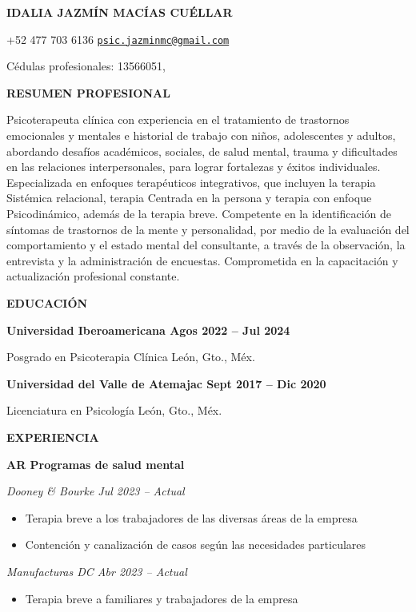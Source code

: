 \textbf{IDALIA JAZMÍN MACÍAS CUÉLLAR}

+52 477 703 6136 \textbar{}
\href{mailto:psic.jazminmc@gmail.com}{\nolinkurl{psic.jazminmc@gmail.com}}

Cédulas profesionales: 13566051,

\textbf{RESUMEN PROFESIONAL}

Psicoterapeuta clínica con experiencia en el tratamiento de trastornos
emocionales y mentales e historial de trabajo con niños, adolescentes y
adultos, abordando desafíos académicos, sociales, de salud mental,
trauma y dificultades en las relaciones interpersonales, para lograr
fortalezas y éxitos individuales. Especializada en enfoques terapéuticos
integrativos, que incluyen la terapia Sistémica relacional, terapia
Centrada en la persona y terapia con enfoque Psicodinámico, además de la
terapia breve. Competente en la identificación de síntomas de trastornos
de la mente y personalidad, por medio de la evaluación del
comportamiento y el estado mental del consultante, a través de la
observación, la entrevista y la administración de encuestas.
Comprometida en la capacitación y actualización profesional constante.

\textbf{EDUCACIÓN}

\textbf{Universidad Iberoamericana Agos 2022 -- Jul 2024}

Posgrado en Psicoterapia Clínica León, Gto., Méx.

\textbf{Universidad del Valle de Atemajac Sept 2017 -- Dic 2020}

Licenciatura en Psicología León, Gto., Méx.

\textbf{EXPERIENCIA}

\textbf{AR Programas de salud mental}

\emph{Dooney \& Bourke \textbar{} Jul 2023 -- Actual}

\begin{itemize}
\item
  Terapia breve a los trabajadores de las diversas áreas de la empresa
\item
  Contención y canalización de casos según las necesidades particulares
\end{itemize}

\emph{Manufacturas DC \textbar{} Abr 2023 -- Actual}

\begin{itemize}
\item
  Terapia breve a familiares y trabajadores de la empresa
\end{itemize}

